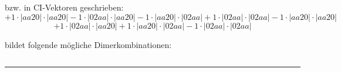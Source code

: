 \documentclass{article}
\begin{document}
\begin{minipage}{\linewidth}
bzw. in CI-Vektoren geschrieben: 
 $$+ 1 \cdot \left|aa20 \right| \cdot \left| aa20 \right| 
- 1 \cdot \left|02aa \right| \cdot \left| aa20 \right| 
- 1 \cdot \left|aa20 \right| \cdot \left| 02aa \right| 
+ 1 \cdot \left|02aa \right| \cdot \left| 02aa \right| 
- 1 \cdot \left|aa20 \right| \cdot \left| aa20 \right| 
 $$ $$ + 1 \cdot \left|02aa \right| \cdot \left| aa20 \right| 
+ 1 \cdot \left|aa20 \right| \cdot \left| 02aa \right| 
- 1 \cdot \left|02aa \right| \cdot \left| 02aa \right| 
$$



 bildet folgende mögliche Dimerkombinationen:

$$$$



\end{minipage}
\vspace{0.5cm}
\hrule
\vspace{0.5cm}
\end{document}
